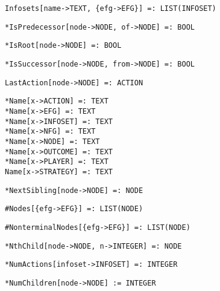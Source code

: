 \protect \large \begin{verbatim} 
Infosets[name->TEXT, {efg->EFG}] =: LIST(INFOSET)
\end{verbatim}\normalsize

\protect \large \begin{verbatim}
*IsPredecessor[node->NODE, of->NODE] =: BOOL
\end{verbatim}\normalsize

\protect \large \begin{verbatim}
*IsRoot[node->NODE] =: BOOL
\end{verbatim}\normalsize

\protect \large \begin{verbatim}
*IsSuccessor[node->NODE, from->NODE] =: BOOL
\end{verbatim}\normalsize

\protect \large \begin{verbatim} 
LastAction[node->NODE] =: ACTION
\end{verbatim}\normalsize

\protect \large \begin{verbatim}
*Name[x->ACTION] =: TEXT
*Name[x->EFG] =: TEXT
*Name[x->INFOSET] =: TEXT
*Name[x->NFG] =: TEXT
*Name[x->NODE] =: TEXT
*Name[x->OUTCOME] =: TEXT
*Name[x->PLAYER] =: TEXT
Name[x->STRATEGY] =: TEXT
\end{verbatim}\normalsize

\protect \large \begin{verbatim}
*NextSibling[node->NODE] =: NODE
\end{verbatim}\normalsize

\protect \large \begin{verbatim} 
#Nodes[{efg->EFG}] =: LIST(NODE)
\end{verbatim}\normalsize

\protect \large \begin{verbatim} 
#NonterminalNodes[{efg->EFG}] =: LIST(NODE)
\end{verbatim}\normalsize

\protect \large \begin{verbatim} 
*NthChild[node->NODE, n->INTEGER] =: NODE
\end{verbatim}\normalsize

\protect \large \begin{verbatim}
*NumActions[infoset->INFOSET] =: INTEGER
\end{verbatim}\normalsize

\protect \large \begin{verbatim}
*NumChildren[node->NODE] := INTEGER
\end{verbatim}\normalsize

